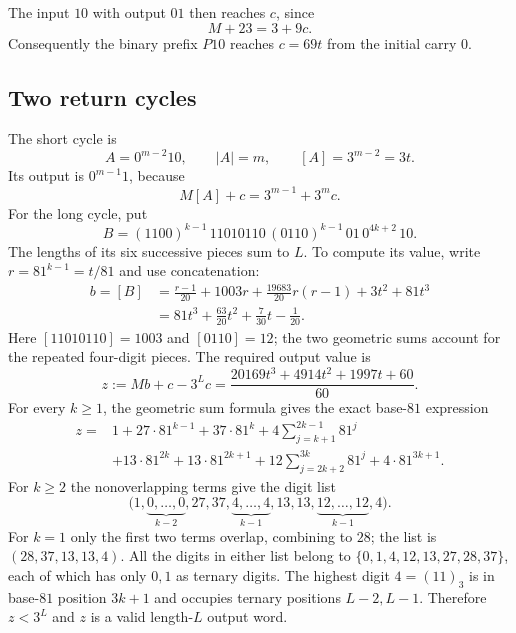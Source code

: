The input $10$ with output $01$ then reaches $c$, since
\begin{equation}\label{familypos:eq:entry}
                  M+23=3+9c.
\end{equation}
Consequently the binary prefix $P10$ reaches $c=69t$ from the
initial carry $0$.

\subsection{Two return cycles}

The short cycle is
\[
 A=0^{m-2}10,\qquad |A|=m,\qquad [A]=3^{m-2}=3t.
\]
Its output is $0^{m-1}1$, because
\begin{equation}\label{familypos:eq:short-cycle}
                    M[A]+c=3^{m-1}+3^mc.
\end{equation}
For the long cycle, put
\begin{equation}\label{familypos:eq:long-word}
 B=(1100)^{k-1}\,11010110\,(0110)^{k-1}\,01\,
                              0^{4k+2}\,10.
\end{equation}
The lengths of its six successive pieces sum to $L$. To compute
its value, write $r=81^{k-1}=t/81$ and use concatenation:
\begin{align*}
 b=[B]
   &=\frac{r-1}{20}+1003r
      +\frac{19683}{20}r(r-1)+3t^2+81t^3\\
   &=81t^3+\frac{63}{20}t^2+\frac7{30}t-\frac1{20}.
\end{align*}
Here $[11010110]=1003$ and $[0110]=12$; the two geometric
sums account for the repeated four-digit pieces.
The required output value is
\begin{equation}\label{familypos:eq:long-output}
 z:=Mb+c-3^Lc
       =\frac{20169t^3+4914t^2+1997t+60}{60}.
\end{equation}
For every $k\ge1$, the geometric sum formula gives the exact
base-$81$ expression
\begin{align*}
 z={}&1+27\cdot81^{k-1}+37\cdot81^k
      +4\sum_{j=k+1}^{2k-1}81^j\\
    &+13\cdot81^{2k}+13\cdot81^{2k+1}
      +12\sum_{j=2k+2}^{3k}81^j+4\cdot81^{3k+1}.
\end{align*}
For $k\ge2$ the nonoverlapping terms give the digit list
\[
 \bigl(1,\underbrace{0,\ldots,0}_{k-2},27,37,
       \underbrace{4,\ldots,4}_{k-1},13,13,
       \underbrace{12,\ldots,12}_{k-1},4\bigr).
\]
For $k=1$ only the first two terms overlap, combining to $28$;
the list is $(28,37,13,13,4)$. All the digits in either list
belong to $\{0,1,4,12,13,27,28,37\}$, each of which has only
$0,1$ as ternary digits. The highest digit $4=(11)_3$ is in
base-$81$ position $3k+1$ and occupies ternary positions
$L-2,L-1$. Therefore $z<3^L$ and $z$ is a valid length-$L$
output word.


